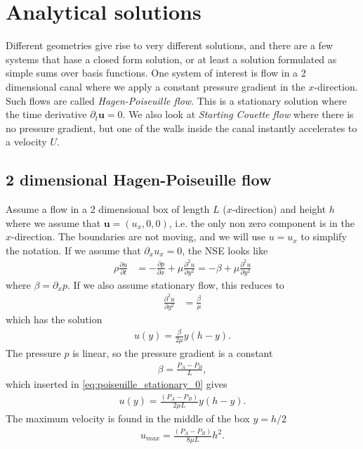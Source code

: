 \documentclass[a4paper,10pt]{article}
\renewcommand{\vec}[1]{\mathbf{#1}}
\renewcommand{\(}{\left(}
\renewcommand{\)}{\right)}
\newcommand{\dpart}[2]{\frac{\partial#1}{\partial#2}}
\newcommand{\dpartt}[2]{\frac{\partial^2#1}{\partial#2^2}}
\begin{document}
\section{Analytical solutions}
Different geometries give rise to very different solutions, and there are a few systems that hase a closed form solution, or at least a solution formulated as simple sums over basis functions. One system of interest is flow in a 2 dimensional canal where we apply a constant pressure gradient in the $x$-direction. Such flows are called \textit{Hagen-Poiseuille flow}. This is a stationary solution where the time derivative $\partial_t \vec u=0$. We also look at \textit{Starting Couette flow} where there is no pressure gradient, but one of the walls inside the canal instantly accelerates to a velocity $U$.

\subsection{2 dimensional Hagen-Poiseuille flow}
Assume a flow in a 2 dimensional box of length $L$ ($x$-direction) and height $h$ where we assume that $\vec u = (u_x,0,0)$, i.e. the only non zero component is in the $x$-direction. The boundaries are not moving, and we will use $u=u_x$ to simplify the notation. If we assume that $\partial_x u_x=0$, the NSE looks like
\begin{align*}
  \rho\dpart{u}{t} &= -\dpart{p}{x} + \mu\dpartt{u}{y} = -\beta + \mu\dpartt{u}{y}
\end{align*}
where $\beta = \partial_x p$. If we also assume stationary flow, this reduces to
\begin{align*}
  \dpartt{u}{y} &= \frac{\beta}{\mu}
\end{align*}
which has the solution
\begin{align}
  \label{eq:poiseuille_stationary_0}
  u(y) = \frac{\beta}{2\mu}y(h-y).
\end{align}
The pressure $p$ is linear, so the pressure gradient is a constant
\begin{align*}
  \beta = \frac{P_A-P_B}{L},
\end{align*}
which inserted in \eqref{eq:poiseuille_stationary_0} gives
\begin{align}
  \label{eq:poiseuille_stationary_full}
  u(y) = \frac{(P_A-P_B)}{2\mu L}y(h-y).
\end{align}
The maximum velocity is found in the middle of the box $y=h/2$
\begin{align}
  \label{eq:poiseuille_stationary}
  u_{max} = \frac{(P_A-P_B)}{8\mu L}h^2.
\end{align}
\end{document}
